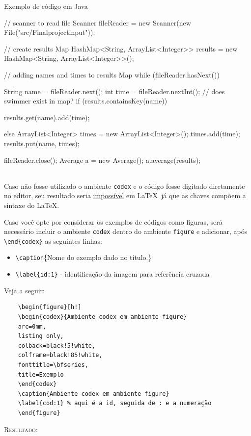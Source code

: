 \documentclass[a4paper,12pt,oneside,openright,extrafontsizes,openbib]{memoir}
\begin{document}
{\begin{codex}{Exemplo de código em Java}
{		// scanner to read file
		Scanner fileReader = new Scanner(new File("src/Finalprojectinput"));
		
		// create results Map
		HashMap<String, ArrayList<Integer>> results = new HashMap<String, ArrayList<Integer>>();
		
		// adding names and times to results Map
		while (fileReader.hasNext()) {
			String name = fileReader.next();
			int time = fileReader.nextInt();
			// does swimmer exist in map?
			if (results.containsKey(name)) {
				results.get(name).add(time);
				
			} else {
				ArrayList<Integer> times = new ArrayList<Integer>();
				times.add(time);
				results.put(name, times);
			}
		}
		fileReader.close();
		Average a = new Average();
		a.average(results);
	}
\end{codex}
\ \\

Caso não fosse utilizado o ambiente \verb|codex| e o código fosse digitado diretamente no editor, seu resultado seria \underline{impossível} em \LaTeX\ já que as chaves compõem a sintaxe do \LaTeX.


Caso você opte por considerar os exemplos de códigos como figuras, será necessário incluir o ambiente \verb|codex| dentro do ambiente \verb|figure| e adicionar, após \verb|\end{codex}| as seguintes linhas:

\begin{itemize}
	\item \verb|\caption|\{Nome do exemplo dado no título.\}
	\item \verb|\label{id:1}| - identificação da imagem para referência cruzada
\end{itemize}

Veja a seguir:

\begin{verbatim}
	\begin{figure}[h!]
	\begin{codex}{Ambiente codex em ambiente figure}
	arc=0mm,
	listing only,
	colback=black!5!white,
	colframe=black!85!white,
	fonttitle=\bfseries,
	title=Exemplo
	\end{codex}
	\caption{Ambiente codex em ambiente figure}
	\label{cod:1} % aqui é a id, seguida de : e a numeração
	\end{figure}
\end{verbatim}

\textsc{Resultado:}

}
\end{document}
